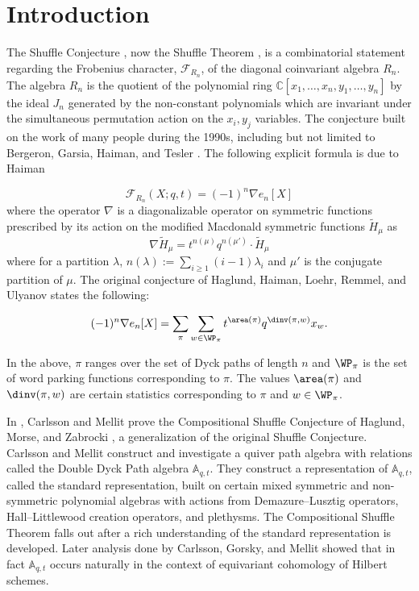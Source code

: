 \section{Introduction}\label{intro section}
The Shuffle Conjecture \cite{HHLRU-2003}, now the Shuffle Theorem \cite{CM_2015}, is a combinatorial statement regarding the Frobenius character, $\mathcal{F}_{R_n}$, of the diagonal coinvariant algebra $R_n.$ The algebra $R_n$ is the quotient of the polynomial ring $\mathbb{C}[x_1,\ldots,x_n,y_1,\ldots,y_n]$ by the ideal $J_n$ generated by the non-constant polynomials which are invariant under the simultaneous permutation action on the $x_i,y_j$ variables.
The conjecture built on the work of many people during the 1990s, including but not limited to Bergeron, Garsia, Haiman,  and Tesler \cite{BGSciFi, GHCat, BGHT}.
The following explicit formula is due to Haiman \cite{HVanish}

    $$ \mathcal{F}_{R_n}(X;q,t) = (-1)^n \nabla e_n[X] $$
    where the operator $\nabla$ is a diagonalizable operator on symmetric functions prescribed by its action on the modified Macdonald symmetric functions  $\widetilde{H}_{\mu}$  as
    $$\nabla \widetilde{H}_{\mu} = t^{n(\mu)} q^{n(\mu')}\cdot  \widetilde{H}_{\mu} $$ where for a partition $\lambda$, $n(\lambda):= \sum_{i \geq 1}(i-1)\lambda_i$ and $\mu'$ is the conjugate partition of $\mu.$
    The original conjecture of Haglund, Haiman, Loehr, Remmel, and Ulyanov \cite{HHLRU-2003} states the following:
        
\begin{thm}

$$ (-1)^n \nabla e_n[X] = \sum_{\pi}\sum_{ w \in \WP_{\pi}} t^{\area(\pi)} q^{\dinv(\pi,w)} x_{w}. $$

\end{thm}

In the above, $\pi$ ranges over the set of Dyck paths of length $n$ and $\WP_{\pi}$ is the set of word parking functions corresponding to $\pi$. The values $\area(\pi)$ and $\dinv(\pi,w)$ are certain statistics corresponding to $\pi$ and $w \in \WP_{\pi}$.


In \cite{CM_2015}, Carlsson and Mellit prove the Compositional Shuffle Conjecture of Haglund, Morse, and Zabrocki \cite{HMZ}, a generalization of the original Shuffle Conjecture. Carlsson and Mellit construct and investigate a quiver path algebra with relations called the Double Dyck Path algebra $\mathbb{A}_{q,t}$. They construct a representation of $\mathbb{A}_{q,t}$, called the standard representation, built on certain mixed symmetric and non-symmetric polynomial algebras with actions from Demazure--Lusztig operators, Hall--Littlewood creation operators, and plethysms. The Compositional Shuffle Theorem 
falls out after a rich understanding of the standard representation is developed. Later analysis done by Carlsson, Gorsky, and Mellit \cite{GCM_2017} showed that in fact $\mathbb{A}_{q,t}$ occurs naturally in the context of equivariant cohomology of Hilbert schemes. 


